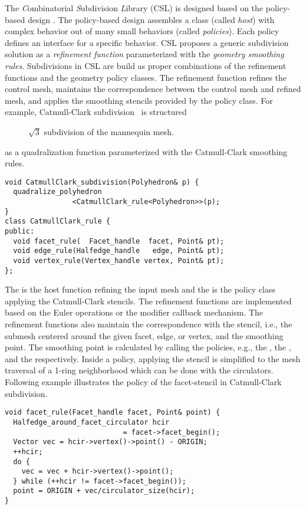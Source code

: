 The \emph{C}ombinatorial \emph{S}ubdivision \emph{L}ibrary 
(CSL) is designed based on the policy-based design 
\cite{Alexandrescu:2001:MCD}.
The policy-based design assembles a class
(called \emph{host}) with complex behavior out of many 
small behaviors (called \emph{policies}).
Each policy defines an interface for a
specific behavior. CSL proposes a 
generic subdivision solution as a \emph{refinement function}
parameterized with the \emph{geometry smoothing rules}.
Subdivisions in CSL are build as proper combinations of the
refinement functions and the geometry policy classes.
The refinement function refines the control mesh,
maintains the correspondence between the control mesh and refined
mesh, and applies the smoothing stencils provided by the policy
class. For example, Catmull-Clark subdivision~\cite{cc} is structured
\begin{figure}[h]
    \caption{$\sqrt{3}$ subdivision of the mannequin mesh.}
    \label{fig:sqrt3}
    \vspace{0.5cm}
\end{figure}
as a quadralization function parameterized with the Catmull-Clark
smoothing rules.


\begin{lstlisting}
void CatmullClark_subdivision(Polyhedron& p) {    
  quadralize_polyhedron
                <CatmullClark_rule<Polyhedron>>(p);  
}
class CatmullClark_rule {
public:
  void facet_rule(  Facet_handle  facet, Point& pt);
  void edge_rule(Halfedge_handle   edge, Point& pt);
  void vertex_rule(Vertex_handle vertex, Point& pt);
};
\end{lstlisting}
\noindent The  
is the host function refining the input mesh
and the  is the policy 
class applying the Catmull-Clark stencils.
The refinement functions are implemented based on the
Euler operations or the modifier callback mechanism.
The refinement functions also maintain the 
correspondence with the stencil, i.e., the submesh 
centered around the given facet, edge, or
vertex, and the smoothing point.
The smoothing point is calculated by calling the 
policies, e.g., the , the 
, and the  
respectively. Inside a policy, applying the 
stencil is simplified to the mesh traversal of a 
1-ring neighborhood which can be done with the 
circulators. Following example illustrates  
the policy of the facet-stencil in Catmull-Clark 
subdivision.
\begin{lstlisting}
void facet_rule(Facet_handle facet, Point& point) {
  Halfedge_around_facet_circulator hcir 
                            = facet->facet_begin();
  Vector vec = hcir->vertex()->point() - ORIGIN;
  ++hcir;
  do {
    vec = vec + hcir->vertex()->point();
  } while (++hcir != facet->facet_begin());
  point = ORIGIN + vec/circulator_size(hcir);
}
\end{lstlisting}

